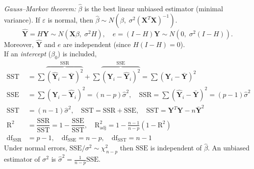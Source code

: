 \documentclass[10pt]{article}
\newcommand{\vect}[1]{\symbf{#1}} %
\begin{document}
\begin{multicols}{3}
\begin{tikzpicture}[>=stealth,scale=0.8]
  \end{tikzpicture}\\[0em]
  \textit{Gauss--Markov theorem:} \( \hat{\beta} \) is the best linear unbiased estimator (minimal variance).
  If \( \varepsilon \) is normal, then \( \hat{\beta} \sim N(\beta,\;\sigma^2(\vect{X}^T \vect{X})^{-1}). \)
  \[ \hat{\vect{Y}} = H \vect{Y} \sim N(\vect{X}\beta,\;\sigma^2 H), \quad  e = (I-H)\vect{Y} \sim N(0,\;\sigma^2 (I-H)). \]
  Moreover, \( \hat{\vect{Y}} \) and \( e \) are independent (since \( H(I-H)=0 \)).\\[0em]
  If an \textit{intercept} (\( \beta_0 \)) is included,
  \begin{align}
    \mathrm{SST}               & = \sum \overbrace{ (\hat{\vect{Y}}_i - \bar{\vect{Y}})^2}^{\mathrm{SSR}} + \sum \overbrace{(\vect{Y}_i-\hat{\vect{Y}}_i)^2}^{\mathrm{SSE}} = \sum (\vect{Y}_i - \bar{\vect{Y}})^2 \\
    \mathrm{SSE}               & = \sum (\vect{Y}_i - \hat{\vect{Y}}_i)^2 = (n - p)\hat{\sigma}^2, \quad \mathrm{SSR} = \sum (\hat{\vect{Y}}_i - \bar{\vect{Y}})^2 = (p-1)\hat{\sigma}^2                           \\
    \mathrm{SST}               & = (n-1)\hat{\sigma}^2, \quad \mathrm{SST} = \mathrm{SSR} + \mathrm{SSE}, \quad \mathrm{SST} = \vect{Y}^T\vect{Y} - n\bar{\vect{Y}}^2                                              \\
    \mathrm{R}^2               & = \dfrac{\mathrm{SSR}}{\mathrm{SST}} = 1 - \dfrac{\mathrm{SSE}}{\mathrm{SST}}, \quad \mathrm{R_{adj}^2} = 1 - \tfrac{n-1}{n-p}\left(1-\mathrm{R^2}\right)                         \\
    \mathrm{df}_{\mathrm{SSR}} & =p-1, \quad \mathrm{df}_{\mathrm{SSE}} = n - p, \quad \mathrm{df}_{\mathrm{SST}}=n-1 \tag{DoF}
  \end{align}
  Under normal errors, \( \mathrm{SSE}/\sigma^2 \sim \chi^2_{\,n-p}\) then \(\mathrm{SSE}\) is independent of \( \hat{\beta} \).
  An unbiased estimator of \( \sigma^2 \) is \( \hat{\sigma}^2 = \tfrac{1}{n-p}\mathrm{SSE}.\)
\end{multicols}
\end{document}
